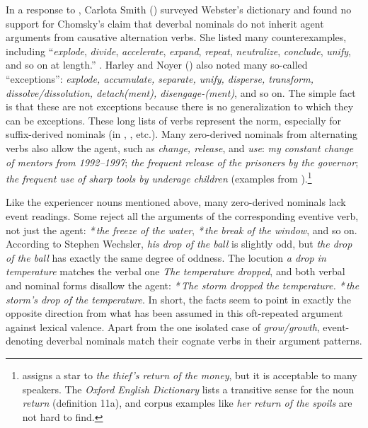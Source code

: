 \begin{exe}
\begin{xlist}[iv.]
\begin{exe}
\begin{xlist}[iv.]
In a response to , Carlota Smith (\citeyear{Smith72a-u}) surveyed
Webster's dictionary and found no support for Chomsky's claim that deverbal nominals do not inherit
agent arguments from causative alternation verbs.  She listed many counterexamples, including
``\emph{explode}, \emph{divide}, \emph{accelerate}, \emph{expand}, \emph{repeat}, \emph{neutralize}, \emph{conclude}, \emph{unify}, and so on at
length.'' \citep[]{Smith72a-u}.  Harley and Noyer (\citeyear{HN2000a}) also noted many so-called
``exceptions'':  \emph{explode, accumulate, separate, unify, disperse, transform,
  dissolve/dissolution, detach(ment), disengage-(ment)}, and so on.  The simple fact is that these are not
exceptions because there is no generalization to which they can be exceptions.  These long lists of
verbs represent the norm, especially for suffix-derived nominals (in , , etc.).
Many zero-derived nominals from alternating verbs also allow the agent, such as  \emph{change,
  release}, and \emph{use}: \emph{my constant change of mentors from 1992--1997}; \emph{the frequent
  release of the prisoners by the governor};  \emph{the frequent use of sharp tools by underage children}
(examples from \citet[fn.\,13]{Borer2003a-u}).\footnote{%
  \citet[, ex.~(231)]{Pesetsky95a-u} assigns a star
to \emph{the thief's return of the money}, but it is acceptable to many speakers. The \emph{Oxford
  English Dictionary} lists a transitive sense for the noun \emph{return} (definition 11a), and
corpus examples like \emph{her return of the spoils} are not hard to find.}   

Like the experiencer nouns mentioned above, many zero-derived nominals lack event readings.  Some
reject all the arguments of the corresponding eventive verb, not just the agent: \emph{*\,the freeze
  of the water}, \emph{*\,the break of the window}, and so on.  According to Stephen Wechsler,
\emph{his drop of the ball} is slightly odd, but \emph{the drop of the ball} has exactly the same
degree of oddness.  The locution \emph{a drop in temperature} matches the verbal one \emph{The
  temperature dropped}, and both verbal and nominal forms disallow the agent: \emph{*\,The storm
  dropped the temperature.} \emph{*\,the storm's drop of the temperature}.  In short, the facts seem to point
in exactly the opposite direction from what has been assumed in this oft-repeated argument against
lexical valence.  Apart from the one isolated case of \emph{grow/growth}, event-denoting deverbal
nominals match their cognate verbs in their argument patterns.


\end{xlist}
\end{exe}
\end{xlist}
\end{exe}
